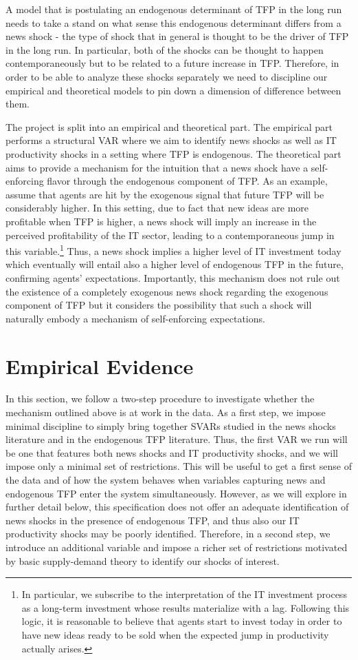 \documentclass{article}
\begin{document}
A model that is postulating an endogenous determinant of TFP in the long run needs to take a stand on what sense this endogenous determinant differs from a news shock - the type of shock that in general is thought to be the driver of TFP in the long run. In particular, both of the shocks can be thought to happen contemporaneously but to be related to a future increase in TFP. Therefore, in order to be able to analyze these shocks separately we need to discipline our empirical and theoretical models to pin down a dimension of difference between them. 

The project is split into an empirical and theoretical part. The empirical part performs a structural VAR where we aim to identify news shocks as well as IT productivity shocks in a setting where TFP is endogenous. The theoretical part aims to provide a mechanism for the intuition that a news shock have a self-enforcing flavor through the endogenous component of TFP. As an example, assume that agents are hit by the exogenous signal that future TFP will be considerably higher. In this setting, due to fact that new ideas are more profitable when TFP is higher, a news shock will imply an increase in the perceived profitability of the IT sector, leading to a contemporaneous jump in this variable.\footnote{In particular, we subscribe to the interpretation of the IT investment process as a long-term investment whose results materialize with a lag. Following this logic, it is reasonable to believe that agents start to invest today in order to have new ideas ready to be sold when the expected jump in productivity actually arises.} Thus, a news shock implies a higher level of IT investment today which eventually will entail also a higher level of endogenous TFP in the future, confirming agents' expectations. Importantly, this mechanism does not rule out the existence of a completely exogenous news shock regarding the exogenous component of TFP but it considers the possibility that such a shock will naturally embody a mechanism of self-enforcing expectations.

\section{Empirical Evidence}

In this section, we follow a two-step procedure to investigate whether the mechanism outlined above is at work in the data. As a first step, we impose minimal discipline to simply bring together SVARs studied in the news shocks literature and in the endogenous TFP literature. Thus, the first VAR we run will be one that features both news shocks and IT productivity shocks, and we will impose only a minimal set of restrictions. This will be useful to get a first sense of the data and of how the system behaves when variables capturing news and endogenous TFP enter the system simultaneously. However, as we will explore in further detail below, this specification does not offer an adequate identification of news shocks in the presence of endogenous TFP, and thus also our IT productivity shocks may be poorly identified. Therefore, in a second step, we introduce an additional variable and impose a richer set of restrictions motivated by basic supply-demand theory to identify our shocks of interest.  
\end{document}
